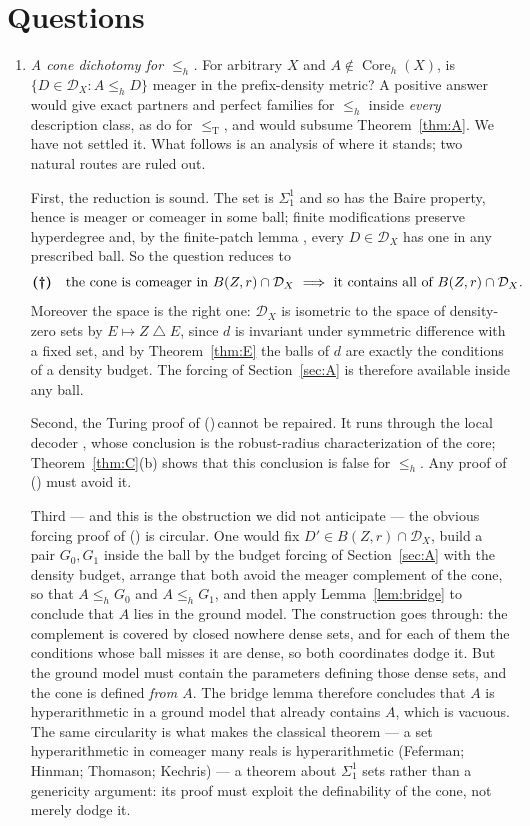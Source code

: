 \documentclass[11pt,letterpaper]{article}
\theoremstyle{definition}
\numberwithin{equation}{section}
\newcommand{\leT}{\le_{\mathrm T}}
\newcommand{\DX}[1]{\mathcal D_{#1}}
\newcommand{\sd}{\mathbin{\triangle}}
\newcommand{\leh}{\le_{h}}
\newcommand{\Coreh}{\operatorname{Core}_h}
\begin{document}
\section{Questions}\label{sec:questions}
\begin{enumerate}[label=\textup{(Q\arabic*)},leftmargin=3em]
\item \emph{A cone dichotomy for $\leh$.} For arbitrary $X$ and $A\notin\Coreh(X)$, is $\{D\in\DX X:A\leh D\}$ meager in the prefix-density metric? A positive answer would give exact partners and perfect families for $\leh$ inside \emph{every} description class, as \cite[Theorems~4.6 and~4.12]{Synthesis} do for $\leT$, and would subsume Theorem~\ref{thm:A}. We have not settled it. What follows is an analysis of where it stands; two natural routes are ruled out.

First, the reduction is sound. The set is $\Sigma^1_1$ and so has the Baire property, hence is meager or comeager in some ball; finite modifications preserve hyperdegree and, by the finite-patch lemma \cite[Lemma~4.1(d)]{Synthesis}, every $D\in\DX X$ has one in any prescribed ball. So the question reduces to
\[
 \textbf{(\dag)}\quad\text{the cone is comeager in }B(Z,r)\cap\DX X\ \Longrightarrow\text{ it contains all of }B(Z,r)\cap\DX X.
\]
Moreover the space is the right one: $\DX X$ is isometric to the space of density-zero sets by $E\mapsto Z\sd E$, since $d$ is invariant under symmetric difference with a fixed set, and by Theorem~\ref{thm:E} the balls of $d$ are exactly the conditions of a density budget. The forcing of Section~\ref{sec:A} is therefore available inside any ball.

Second, the Turing proof of (\dag)$\,$cannot be repaired. It runs through the local decoder \cite[Lemma~4.3]{Synthesis}, whose conclusion is the robust-radius characterization of the core; Theorem~\ref{thm:C}(b) shows that this conclusion is false for $\leh$. Any proof of (\dag) must avoid it.

Third --- and this is the obstruction we did not anticipate --- the obvious forcing proof of (\dag) is circular. One would fix $D'\in B(Z,r)\cap\DX X$, build a pair $G_0,G_1$ inside the ball by the budget forcing of Section~\ref{sec:A} with the density budget, arrange that both avoid the meager complement of the cone, so that $A\leh G_0$ and $A\leh G_1$, and then apply Lemma~\ref{lem:bridge} to conclude that $A$ lies in the ground model. The construction goes through: the complement is covered by closed nowhere dense sets, and for each of them the conditions whose ball misses it are dense, so both coordinates dodge it. But the ground model must contain the parameters defining those dense sets, and the cone is defined \emph{from $A$}. The bridge lemma therefore concludes that $A$ is hyperarithmetic in a ground model that already contains $A$, which is vacuous. The same circularity is what makes the classical theorem --- a set hyperarithmetic in comeager many reals is hyperarithmetic (Feferman; Hinman; Thomason; Kechris) --- a theorem about $\Sigma^1_1$ sets rather than a genericity argument: its proof must exploit the definability of the cone, not merely dodge it.


\end{enumerate}
\end{document}
